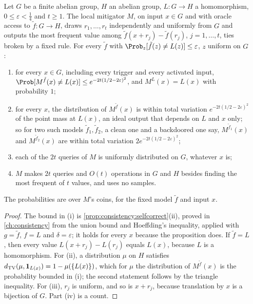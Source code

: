 \begin{refsection}
\begin{theorem}\label{thm:backdoors:mitigation}
Let $G$ be a finite abelian group, $H$ an abelian group, $L\colon G\to H$ a homomorphism, $0\le\varepsilon<\frac14$ and $t\ge1$. The local mitigator $M$, on input $x\in G$ and with oracle access to $\tilde f\colon G\to H$, draws $r_1,\dots,r_t$ independently and uniformly from $G$ and outputs the most frequent value among $\tilde f(x+r_j)-\tilde f(r_j)$, $j=1,\dots,t$, ties broken by a fixed rule. For every $\tilde f$ with $\Prob_{z}[\tilde f(z)\ne L(z)]\le\varepsilon$, $z$ uniform on $G$:
\begin{enumerate}
\item for every $x\in G$, including every trigger and every activated input, $\Prob[M^{\tilde f}(x)\ne L(x)]\le e^{-2t(1/2-2\varepsilon)^2}$, and $M^{L}(x)=L(x)$ with probability $1$;
\item for every $x$, the distribution of $M^{\tilde f}(x)$ is within total variation $e^{-2t(1/2-2\varepsilon)^2}$ of the point mass at $L(x)$, an ideal output that depends on $L$ and $x$ only; so for two such models $\tilde f_1,\tilde f_2$, a clean one and a backdoored one say, $M^{\tilde f_1}(x)$ and $M^{\tilde f_2}(x)$ are within total variation $2e^{-2t(1/2-2\varepsilon)^2}$;
\item each of the $2t$ queries of $M$ is uniformly distributed on $G$, whatever $x$ is;
\item $M$ makes $2t$ queries and $O(t)$ operations in $G$ and $H$ besides finding the most frequent of $t$ values, and uses no samples.
\end{enumerate}
The probabilities are over $M$'s coins, for the fixed model $\tilde f$ and input $x$.
\end{theorem}

\begin{proof}
The bound in (i) is \cref{prop:consistency:selfcorrect}(ii), proved in \cref{ch:consistency} from the union bound and Hoeffding's inequality, applied with $g=\tilde f$, $f=L$ and $\delta=\varepsilon$; it holds for every $x$ because the proposition does. If $\tilde f=L$, then every value $L(x+r_j)-L(r_j)$ equals $L(x)$, because $L$ is a homomorphism. For (ii), a distribution $\mu$ on $H$ satisfies $d_{\mathrm{TV}}(\mu,\mathbf 1_{L(x)})=1-\mu(\{L(x)\})$, which for $\mu$ the distribution of $M^{\tilde f}(x)$ is the probability bounded in (i); the second statement follows by the triangle inequality. For (iii), $r_j$ is uniform, and so is $x+r_j$, because translation by $x$ is a bijection of $G$. Part (iv) is a count.
\end{proof}


\end{refsection}
